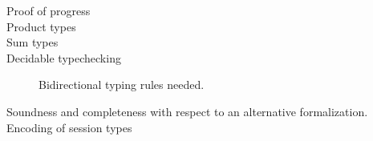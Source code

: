 \documentclass[a4paper,UKenglish,cleveref, autoref, thm-restate,authorcolumns]{lipics-v2019}
\theoremstyle{definition}
\begin{document}
\begin{description}

\item [Proof of progress]

\item [Product types]

\item [Sum types]

\item [Decidable typechecking]

  Bidirectional typing rules needed.

\item [Soundness and completeness with respect to an alternative formalization.]

\item [Encoding of session types]

\end{description}

\newpage


\newpage
\appendix

\end{document}
